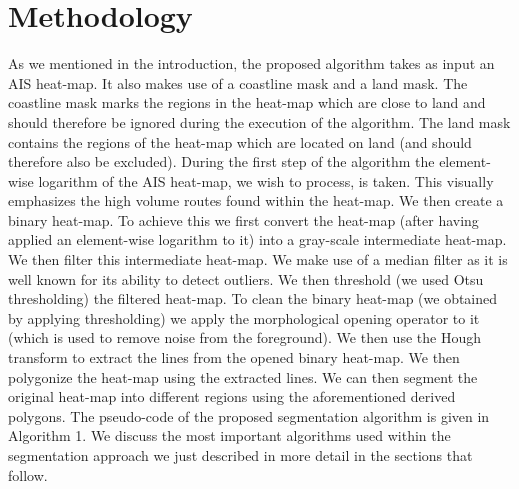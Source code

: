 \documentclass{article}
\begin{document}
\section{Methodology}
\label{sec:met}
As we mentioned in the introduction, the proposed algorithm takes as input an AIS heat-map. It also makes use of a coastline mask and a land mask. The coastline mask
marks the regions in the heat-map which are close to land and should therefore be ignored during the execution of the algorithm. The land mask contains the regions of the heat-map which 
are located on land (and should therefore also be excluded). During the first step of the algorithm the element-wise logarithm of the AIS heat-map, we wish to process, is taken. This visually emphasizes the high volume routes found within the heat-map. We then 
create a binary heat-map. To achieve this we first convert the heat-map (after having applied an element-wise logarithm to it) into a gray-scale intermediate heat-map. We then filter this intermediate heat-map. We make use of a median filter as it is well known for its ability to detect outliers. We then threshold (we used Otsu thresholding) the  
filtered heat-map. To clean the binary heat-map (we obtained by applying thresholding) we apply the morphological opening operator to it (which is used to remove noise from the foreground).
We then use the Hough transform to extract the lines from the opened binary heat-map. We then polygonize the heat-map using the extracted lines. We can then 
segment the original heat-map into different regions using the aforementioned derived polygons. The pseudo-code of the proposed segmentation algorithm is given in Algorithm 1. We discuss the most important algorithms used within the segmentation approach we 
just described in more detail in the sections that follow.  
\end{document}
